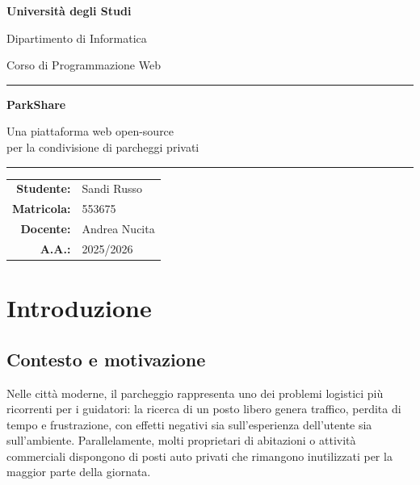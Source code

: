 \documentclass[12pt, a4paper]{article}
\begin{document}
\begin{titlepage}
\centering

\vspace*{2cm}

{\LARGE\bfseries\color{accent} Università degli Studi\par}
{\large Dipartimento di Informatica\par}
{\large Corso di Programmazione Web\par}

\vspace{2cm}

\rule{\linewidth}{1.5pt}\par
\vspace{0.5cm}
{\Huge\bfseries ParkShare\par}
\vspace{0.3cm}
{\Large\color{gray} Una piattaforma web open-source\\ per la condivisione di parcheggi privati\par}
\vspace{0.5cm}
\rule{\linewidth}{1.5pt}\par

\vspace{2.5cm}

\begin{tabular}{rl}
    \textbf{Studente:}    & Sandi Russo \\[4pt]
    \textbf{Matricola:}   & 553675 \\[4pt]
    \textbf{Docente:}     & Andrea Nucita \\[4pt]
    \textbf{A.A.:}        & 2025/2026 \\
\end{tabular}

\end{titlepage}

\newpage
\tableofcontents
\newpage

\section{Introduzione}

\subsection{Contesto e motivazione}

Nelle città moderne, il parcheggio rappresenta uno dei problemi logistici più ricorrenti per i
guidatori: la ricerca di un posto libero genera traffico, perdita di tempo e frustrazione, con
effetti negativi sia sull'esperienza dell'utente sia sull'ambiente. Parallelamente, molti
proprietari di abitazioni o attività commerciali dispongono di posti auto privati che rimangono
inutilizzati per la maggior parte della giornata.
\end{document}

